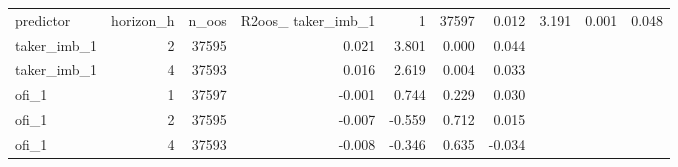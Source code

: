 \begin{tabular}{lrrrrrr}
\toprule
predictor & horizon_h & n_oos & R2oos_%
\midrule
taker_imb_1 & 1 & 37597 & 0.012 & 3.191 & 0.001 & 0.048 \\
taker_imb_1 & 2 & 37595 & 0.021 & 3.801 & 0.000 & 0.044 \\
taker_imb_1 & 4 & 37593 & 0.016 & 2.619 & 0.004 & 0.033 \\
ofi_1 & 1 & 37597 & -0.001 & 0.744 & 0.229 & 0.030 \\
ofi_1 & 2 & 37595 & -0.007 & -0.559 & 0.712 & 0.015 \\
ofi_1 & 4 & 37593 & -0.008 & -0.346 & 0.635 & -0.034 \\
\bottomrule
\end{tabular}
